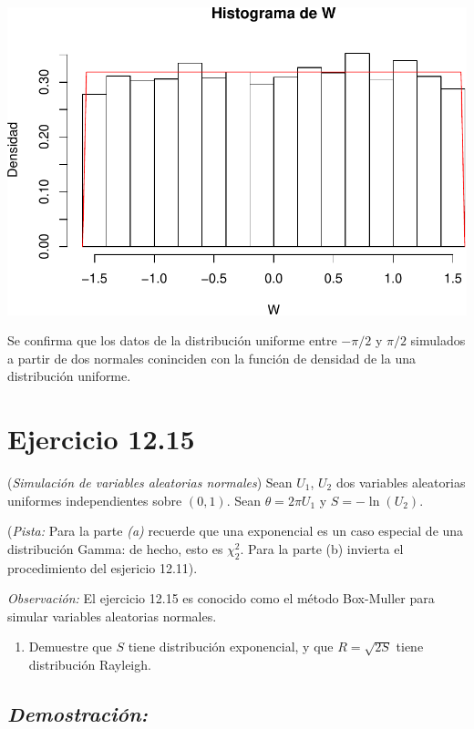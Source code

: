 \documentclass[]{article}
\providecommand{\tightlist}{%
  \setlength{\itemsep}{0pt}\setlength{\parskip}{0pt}}
\begin{document}
\includegraphics{notebook_simulaciones_files/figure-latex/unnamed-chunk-9-1.pdf}

Se confirma que los datos de la distribución uniforme entre \(-\pi/2\) y
\(\pi/2\) simulados a partir de dos normales coninciden con la función
de densidad de la una distribución uniforme.

\section{Ejercicio 12.15}\label{ejercicio-12.15}

(\emph{Simulación de variables aleatorias normales}) Sean \(U_1\),
\(U_2\) dos variables aleatorias uniformes independientes sobre
\((0,1)\). Sean \(\theta=2\pi U_1\) y \(S=-\ln(U_2)\).

(\emph{Pista:} Para la parte \emph{(a)} recuerde que una exponencial es
un caso especial de una distribución Gamma: de hecho, esto es
\(\chi_2^2\). Para la parte (b) invierta el procedimiento del esjericio
12.11).

\emph{Observación:} El ejercicio 12.15 es conocido como el método
Box-Muller para simular variables aleatorias normales.

\begin{enumerate}
\def\labelenumi{\alph{enumi}.}
\tightlist
\item
  Demuestre que \(S\) tiene distribución exponencial, y que
  \(R =\sqrt{2S}\) tiene distribución Rayleigh.
\end{enumerate}

\subsection{\texorpdfstring{\emph{Demostración:}}{Demostración:}}\label{demostracion-2}
\end{document}

